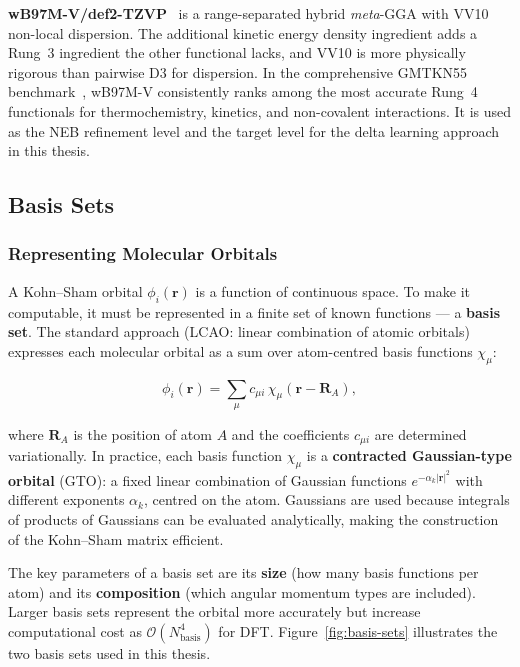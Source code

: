 \textbf{\mbox{wB97M-V/def2-TZVP}}~\cite{mardirossian2016} is a range-separated
hybrid \emph{meta}-GGA with VV10 non-local dispersion. The additional kinetic
energy density ingredient adds a Rung~3 ingredient the other functional lacks, and
VV10 is more physically rigorous than pairwise D3 for dispersion. In the
comprehensive GMTKN55 benchmark~\cite{goerigk2017}, \mbox{wB97M-V} consistently
ranks among the most accurate Rung~4 functionals for thermochemistry, kinetics,
and non-covalent interactions. It is used as the NEB refinement level and the
target level for the delta learning approach in this thesis.

\subsection{Basis Sets}
\label{sec:background-basis}

\subsubsection{Representing Molecular Orbitals}

A Kohn--Sham orbital $\phi_i(\mathbf{r})$ is a function of continuous space.
To make it computable, it must be represented in a finite set of known
functions --- a \textbf{basis set}. The standard approach (LCAO: linear combination
of atomic orbitals) expresses each molecular orbital as a sum over atom-centred
basis functions $\chi_\mu$:

\begin{equation}
  \phi_i(\mathbf{r}) = \sum_\mu c_{\mu i}\, \chi_\mu(\mathbf{r} - \mathbf{R}_A),
\end{equation}

where $\mathbf{R}_A$ is the position of atom $A$ and the coefficients $c_{\mu i}$
are determined variationally. In practice, each basis function $\chi_\mu$ is a
\textbf{contracted Gaussian-type orbital} (GTO): a fixed linear combination of
Gaussian functions $e^{-\alpha_k |\mathbf{r}|^2}$ with different exponents
$\alpha_k$, centred on the atom. Gaussians are used because integrals of products
of Gaussians can be evaluated analytically, making the construction of the Kohn--Sham
matrix efficient.

The key parameters of a basis set are its \textbf{size} (how many basis functions
per atom) and its \textbf{composition} (which angular momentum types are included).
Larger basis sets represent the orbital more accurately but increase computational
cost as $\mathcal{O}(N_\text{basis}^4)$ for DFT. Figure~\ref{fig:basis-sets}
illustrates the two basis sets used in this thesis.

